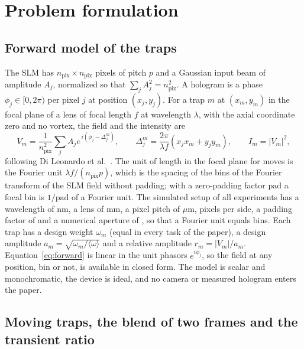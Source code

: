 \section{Problem formulation}\label{sec:problem}

\subsection{Forward model of the traps}

The SLM has $n_{\mathrm{pix}}\times n_{\mathrm{pix}}$ pixels of pitch $p$ and a Gaussian input beam of amplitude $A_j$, normalized so that $\sum_jA_j^2=n_{\mathrm{pix}}^2$. A hologram is a phase $\phi_j\in[0,2\pi)$ per pixel $j$ at position $(x_j,y_j)$. For a trap $m$ at $(x_m,y_m)$ in the focal plane of a lens of focal length $f$ at wavelength $\lambda$, with the axial coordinate zero and no vortex, the field and the intensity are
\begin{equation}
V_m=\frac1{n_{\mathrm{pix}}^2}\sum_jA_je^{\,i(\phi_j-\Delta_j^m)},\qquad \Delta_j^m=\frac{2\pi}{\lambda f}(x_jx_m+y_jy_m),\qquad I_m=|V_m|^2,\label{eq:forward}
\end{equation}
following Di Leonardo et al.~\cite{dileonardo}. The unit of length in the focal plane for moves is the Fourier unit $\lambda f/(n_{\mathrm{pix}}p)$, which is the spacing of the bins of the Fourier transform of the SLM field without padding; with a zero-padding factor $\mathrm{pad}$ a focal bin is $1/\mathrm{pad}$ of a Fourier unit. The simulated setup of all experiments has a wavelength of \setupLambda{} nm, a lens of \setupFocal{} mm, a pixel pitch of \setupPitch{} $\mu$m, \setupNpix{} pixels per side, a padding factor of \setupPad{} and a numerical aperture of \setupNa, so that a Fourier unit equals \setupPad{} bins. Each trap has a design weight $\omega_m$ (equal in every task of the paper), a design amplitude $a_m=\sqrt{\omega_m/\langle\omega\rangle}$ and a relative amplitude $r_m=|V_m|/a_m$. Equation~\ref{eq:forward} is linear in the unit phasors $e^{i\phi_j}$, so the field at any position, bin or not, is available in closed form. The model is scalar and monochromatic, the device is ideal, and no camera or measured hologram enters the paper.

\subsection{Moving traps, the blend of two frames and the transient ratio}

